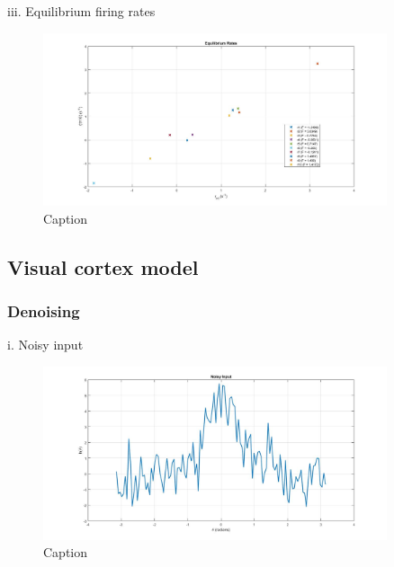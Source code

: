 \documentclass{article}
\begin{document}
iii. Equilibrium firing rates
\begin{figure}[H] 
	\begin{center}
		\includegraphics[width=0.9\textwidth]{Section1/Part2/Retry/Q2a_iii_gInt.jpg}
		\caption{Caption \label{Q2a_iii_g2}}
	\end{center}
\end{figure}
	
\subsection{Visual cortex model}

\subsubsection{Denoising}	
i. Noisy input
\begin{figure}[H] 
	\begin{center}
		\includegraphics[width=0.9\textwidth]{Section1/Part3/3a_i.jpg}
		\caption{Caption \label{Q2a_iii_g2}}
	\end{center}
\end{figure}
\end{document}
